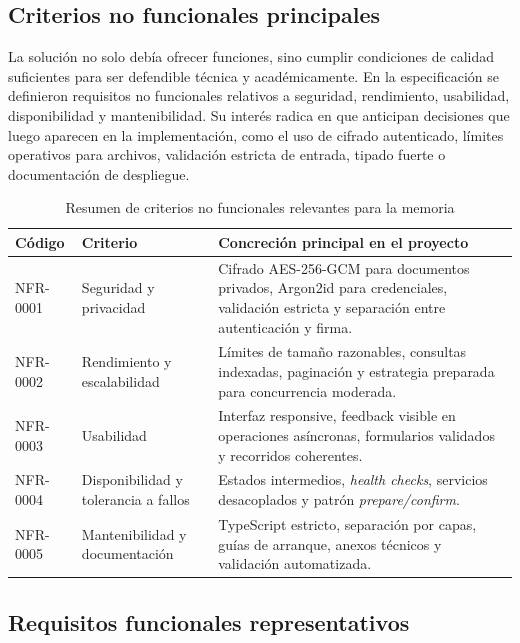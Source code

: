 \documentclass[11pt, a4paper]{article}
\begin{document}
\subsection{Criterios no funcionales principales}

La solución no solo debía ofrecer funciones, sino cumplir condiciones de calidad suficientes para ser defendible técnica y académicamente. En la especificación se definieron requisitos no funcionales relativos a seguridad, rendimiento, usabilidad, disponibilidad y mantenibilidad. Su interés radica en que anticipan decisiones que luego aparecen en la implementación, como el uso de cifrado autenticado, límites operativos para archivos, validación estricta de entrada, tipado fuerte o documentación de despliegue.

\begin{table}[H]
    \centering
    \small
    \begin{tabular}{|p{2.4cm}|p{3.5cm}|p{6.6cm}|}
    \hline
    \textbf{Código} & \textbf{Criterio} & \textbf{Concreción principal en el proyecto} \\
    \hline
    NFR-0001 & Seguridad y privacidad & Cifrado AES-256-GCM para documentos privados, Argon2id para credenciales, validación estricta y separación entre autenticación y firma. \\
    \hline
    NFR-0002 & Rendimiento y escalabilidad & Límites de tamaño razonables, consultas indexadas, paginación y estrategia preparada para concurrencia moderada. \\
    \hline
    NFR-0003 & Usabilidad & Interfaz responsive, feedback visible en operaciones asíncronas, formularios validados y recorridos coherentes. \\
    \hline
    NFR-0004 & Disponibilidad y tolerancia a fallos & Estados intermedios, \textit{health checks}, servicios desacoplados y patrón \textit{prepare/confirm}. \\
    \hline
    NFR-0005 & Mantenibilidad y documentación & TypeScript estricto, separación por capas, guías de arranque, anexos técnicos y validación automatizada. \\
    \hline
    \end{tabular}
    \caption{Resumen de criterios no funcionales relevantes para la memoria}
    \label{tab:requisitos-no-funcionales-sintesis}
\end{table}

\subsection{Requisitos funcionales representativos}
\end{document}
